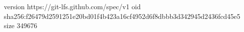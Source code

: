 version https://git-lfs.github.com/spec/v1
oid sha256:f26479d2591251e20bd01f4b423a16cf4952d6f8dbbb3d342945d2436fcd45e5
size 349676
